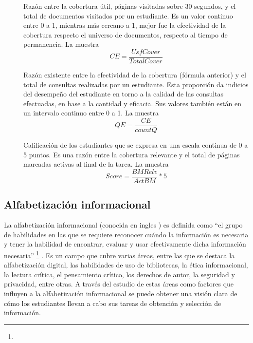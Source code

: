 \begin{description}
	\item [] Razón entre la cobertura útil, páginas visitadas sobre 30 segundos, y el total de documentos visitados por un estudiante. Es un valor continuo entre 0 a 1, mientras más cercano a 1, mejor fue la efectividad de la cobertura respecto el universo de documentos, respecto al tiempo de permanencia. La  muestra     
	\begin{equation}
	CE = \frac{UsfCover}{TotalCover}
	\label{eq:CE}
	\end{equation}

	\item [] Razón existente entre la efectividad de la cobertura (fórmula anterior) y el total de consultas realizadas por un estudiante. Esta proporción da indicios del desempeño del estudiante en torno a la calidad de las consultas efectuadas, en base a la cantidad y eficacia. Sus valores también están en un intervalo continuo entre 0 a 1. La  muestra
	\begin{equation}
	QE = \frac{CE}{countQ}
	\label{eq:QE}
	\end{equation}

	\item [] Calificación de los estudiantes que se expresa en una escala continua de 0 a 5 puntos. Es una razón entre la cobertura relevante y el total de páginas marcadas activas al final de la tarea. La  muestra
	\begin{equation}
	Score = \frac{BMRelv}{ActBM} * 5
	\label{eq:score}
	\end{equation}

\end{description}

\subsection{Alfabetización informacional}
\label{subsec:alfabetizacion}
La alfabetización informacional (conocida en ingles ) es definida como “el grupo de habilidades en las que se requiere reconocer cuándo la información es necesaria y tener la habilidad de encontrar, evaluar y usar efectivamente dicha información necesaria” \footnote{\traduccionlibre} \parencite[p.~2]{american2000information}. Es un campo que cubre varias áreas, entre las que se destaca la alfabetización digital, las habilidades de uso de bibliotecas, la ética informacional, la lectura crítica, el pensamiento crítico, los derechos de autor, la seguridad y privacidad, entre otras. A través del estudio de estas áreas como factores que influyen a la alfabetización informacional se puede obtener una visión clara de cómo los estudiantes llevan a cabo sus tareas de obtención y selección de información.

